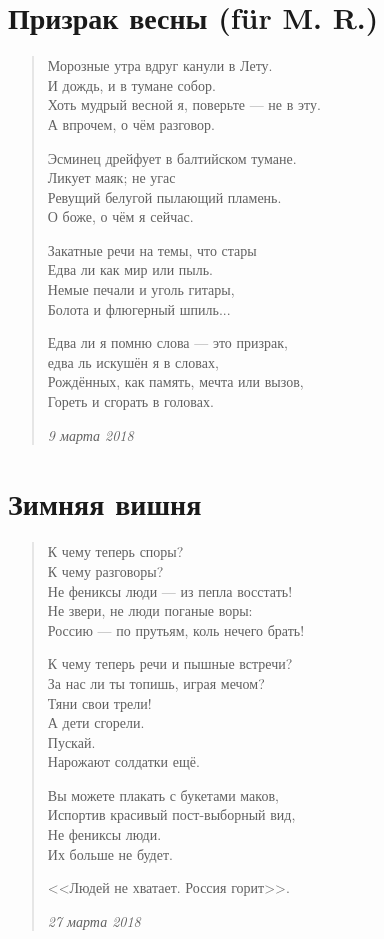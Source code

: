 \section{Призрак весны (f\"{u}r M. R.)}

\begin{verse}
Морозные утра вдруг канули в Лету.\\
И дождь, и в тумане собор.\\
Хоть мудрый весной я, поверьте --- не в эту.\\
А впрочем, о чём разговор.

Эсминец дрейфует в балтийском тумане.\\
Ликует маяк; не угас\\
Ревущий белугой пылающий пламень.\\
О боже, о чём я сейчас.

Закатные речи на темы, что стары\\
Едва ли как мир или пыль.\\
Немые печали и уголь гитары,\\
Болота и флюгерный шпиль...

Едва ли я помню слова --- это призрак,\\
едва ль искушён я в словах,\\
Рождённых, как память, мечта или вызов,\\
Гореть и сгорать в головах.

\emph{9 марта 2018}
\end{verse}
\newpage

\section{Зимняя вишня}

\begin{verse}

К чему теперь споры?\\
К чему разговоры?\\
Не фениксы люди --- из пепла восстать!\\
Не звери, не люди поганые воры:\\
Россию --- по прутьям, коль нечего брать!

К чему теперь речи и пышные встречи?\\
За нас ли ты топишь, играя мечом?\\
Тяни свои трели!\\
А дети сгорели.\\
Пускай.\\
Нарожают солдатки ещё.

Вы можете плакать с букетами маков,\\
Испортив красивый пост-выборный вид,\\
Не фениксы люди.\\
Их больше не будет.

<<Людей не хватает. Россия горит>>.

\emph{27 марта 2018}
\end{verse}
\newpage
